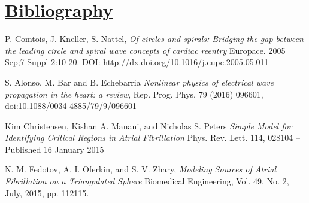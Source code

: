 \documentclass[twocolumn, a1paper, 12pt]{article}
\begin{document}





\section{\textbf{\underline{Bibliography}}}
\begin{thebibliography}{1}



P. Comtois, J. Kneller, S. Nattel,
\emph{Of circles and spirals: Bridging the gap between the leading circle and spiral wave concepts of cardiac reentry}
Europace. 2005 Sep;7 Suppl 2:10-20.
DOI: http://dx.doi.org/10.1016/j.eupc.2005.05.011



S. Alonso, M. Bar and B. Echebarria
\emph{Nonlinear physics of electrical wave
propagation in the heart: a review},
Rep. Prog. Phys. 79 (2016) 096601, 
doi:10.1088/0034-4885/79/9/096601

Kim Christensen, Kishan A. Manani, and Nicholas S. Peters
\emph{Simple Model for Identifying Critical Regions in Atrial Fibrillation}
Phys. Rev. Lett. 114, 028104 – Published 16 January 2015



N. M. Fedotov,  A. I. Oferkin, and S. V. Zhary,
\emph{Modeling Sources of Atrial Fibrillation on a Triangulated Sphere}
Biomedical Engineering, Vol. 49, No. 2, July, 2015, pp. 112115. 


\end{thebibliography}
\end{document}
